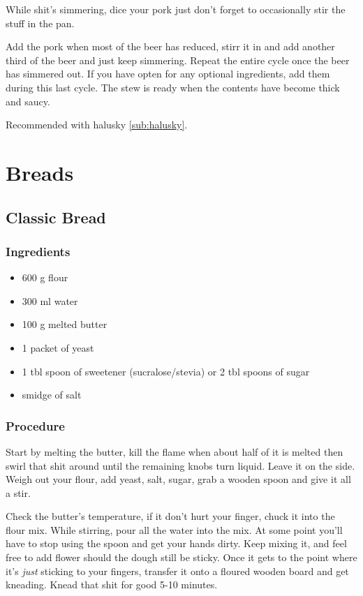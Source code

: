 \documentclass[10pt]{article}
\begin{document}
While shit's simmering, dice your pork just don't forget to occasionally stir the stuff in the pan. \par

Add the pork when most of the beer has reduced, stirr it in and add another third of the beer and just keep simmering. Repeat the entire cycle once the beer has simmered out. If you have opten for any optional ingredients, add them during this last cycle. The stew is ready when the contents have become thick and saucy.\par

Recommended with halusky \ref{sub:halusky}.


\section{Breads}%
\label{sec:breads}

\subsection{Classic Bread}%
\label{sub:classic_bread}

\subsubsection{Ingredients}%
\label{ssub:classic_bread_ingredients}

\begin{itemize}
	\item 600 g flour
	\item 300 ml water
	\item 100 g melted butter
	\item 1 packet of yeast
	\item 1 tbl spoon of sweetener (sucralose/stevia) or 2 tbl spoons of sugar
	\item smidge of salt
\end{itemize}
\subsubsection{Procedure}%
\label{ssub:classic_bread_procedure}

Start by melting the butter, kill the flame when about half of it is melted then swirl that shit around until the remaining knobs turn liquid. Leave it on the side.
Weigh out your flour, add yeast, salt, sugar, grab a wooden spoon and give it all a stir.\par

Check the butter's temperature, if it don't hurt your finger, chuck it into the flour mix. While stirring, pour all the water into the mix. At some point you'll have to stop using the spoon and get your hands dirty. Keep mixing it, and feel free to add flower should the dough still be sticky. Once it gets to the point where it's \textit{just} sticking to your fingers, transfer it onto a floured wooden board and get kneading. Knead that shit for good 5-10 minutes.\par
\end{document}
